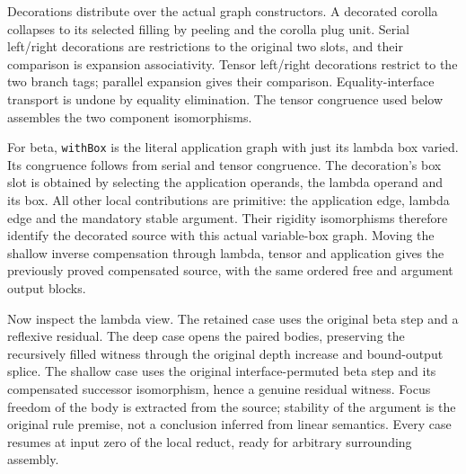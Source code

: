 
Decorations distribute over the actual graph constructors. A decorated
corolla collapses to its selected filling by peeling and the corolla plug
unit. Serial left/right decorations are restrictions to the original two
slots, and their comparison is expansion associativity. Tensor left/right
decorations restrict to the two branch tags; parallel expansion gives their
comparison. Equality-interface transport is undone by equality elimination.
The tensor congruence used below assembles the two component isomorphisms.


For beta, \texttt{withBox} is the literal application graph with just its
lambda box varied. Its congruence follows from serial and tensor congruence.
The decoration's box slot is obtained by selecting the application operands,
the lambda operand and its box. All other local contributions are primitive:
the application edge, lambda edge and the mandatory stable argument.
Their rigidity isomorphisms therefore identify the decorated source with
this actual variable-box graph. Moving the shallow inverse compensation
through lambda, tensor and application gives the previously proved
compensated source, with the same ordered free and argument output blocks.


Now inspect the lambda view. The retained case uses the original beta step
and a reflexive residual. The deep case opens the paired bodies, preserving
the recursively filled witness through the original depth increase and
bound-output splice. The shallow case uses the original interface-permuted
beta step and its compensated successor isomorphism, hence a genuine
residual witness. Focus freedom of the body is extracted from the source;
stability of the argument is the original rule premise, not a conclusion
inferred from linear semantics. Every case resumes at input zero of the
local reduct, ready for arbitrary surrounding assembly.

